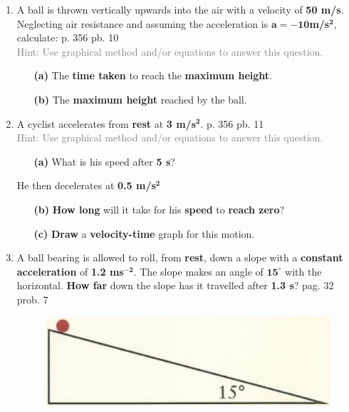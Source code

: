 \documentclass[A4,12pt]{article}
\begin{document}
\begin{enumerate}[label=\bfseries (\arabic*)]
\item A ball is thrown vertically upwards into the air with a velocity of \textbf{50 m/s}. Neglecting air resistance and assuming the acceleration is $\bm{a = -10 }$\textbf{m/s}$\bm{^2}$, calculate: \cite{CCEADA} p. 356 pb. 10\\
\textcolor{gray}{Hint: Use graphical method and/or equations to answer this question.}
%
\begin{itemize}
    \item[\bf (a)] The \textbf{time taken} to reach the \textbf{maximum height}.
    \item[\bf (b)] The \textbf{maximum height} reached by the ball.
\end{itemize}
%
%
%
%
%
%
%
%
%
%
\item A cyclist accelerates from \textbf{rest} at \textbf{3 m/s}$\bm{^2}$. \cite{CCEADA} p. 356 pb. 11\\
\textcolor{gray}{Hint: Use graphical method and/or equations to answer this question.}
%
\begin{itemize}
    \item[\bf (a)] What is his speed after \textbf{5 s}?
\end{itemize}
He then decelerates at \textbf{0.5 m/s}$\bm{^2}$
\begin{itemize}
    \item[\bf (b)] \textbf{How long} will it take for his \textbf{speed} to \textbf{reach zero}? 
    \item[\bf (c)] \textbf{Draw} a \textbf{velocity-time} graph for this motion.
\end{itemize}
%
%
%
%
%
%
%
%
%
%
%
%
%
%
%
%
%
%
%
%
%
%
%
%
%
%
%
%
\item A ball bearing is allowed to roll, from {\bf rest}, down a slope with a {\bf constant acceleration} of {\bf 1.2 ms}$\bm{^{-2}}$. The slope makes an angle of $\bm{15^\circ}$ with the horizontal. {\bf How  far} down the slope has it travelled after {\bf 1.3 s}? \cite{ASCCEA} pag. 32 prob. 7 
%
\begin{figure}[H]
    \centering
    \includegraphics[scale=0.5]{pag32prob7.png}

\end{figure}
\end{enumerate}
\end{document}
